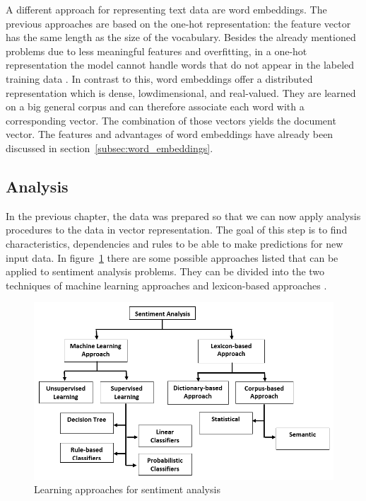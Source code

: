 \documentclass[article,type=msc,colorback,accentcolor=tud7b]{tudthesis}
\begin{document}
    A different approach for representing text data are word embeddings. The previous approaches are based on the one-hot representation: the feature vector has the same length as the size of the vocabulary. Besides the already mentioned problems due to less meaningful features and overfitting, in a one-hot representation the model cannot handle words that do not appear in the labeled training data \autocite{Turian2010}. In contrast to this, word embeddings offer a distributed representation which is dense, lowdimensional, and real-valued. They are learned on a big general corpus and can therefore associate each word with a corresponding vector. The combination of those vectors yields the document vector. The features and advantages of word embeddings have already been discussed in section~\ref{subsec:word_embeddings}.

  \subsection{Analysis}
  \label{subsec:analysis}
    In the previous chapter, the data was prepared so that we can now apply analysis procedures to the data in vector representation. The goal of this step is to find characteristics, dependencies and rules to be able to make predictions for new input data. In figure~\ref{fig:learning_approaches_sentiment_analysis} there are some possible approaches listed that can be applied to sentiment analysis problems. They can be divided into the two techniques of machine learning approaches and lexicon-based approaches \autocite{Kharde2016}.
    
    \begin{figure}[H]
      \centering
      \includegraphics[scale=0.5]{images/learning_approaches_sentiment_analysis}
      \caption[Learning approaches for sentiment analysis]{Learning approaches for sentiment analysis \autocite{Halibas2018}\protect\footnotemark}
      \label{fig:learning_approaches_sentiment_analysis}
    \end{figure}
    
\end{document}
